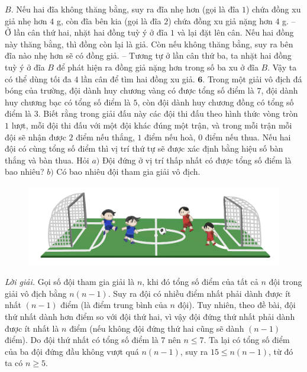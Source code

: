 \begin{multicols}{2}
	\vskip 0.1cm
	$B.$ Nếu hai đĩa không thăng bằng, suy ra  đĩa nhẹ  hơn  (gọi là đĩa $1$) chứa đồng xu giả nhẹ hơn $4$ g, còn đĩa bên kia (gọi là đĩa $2$) chứa đồng xu giả nặng hơn $4$ g.
	\vskip 0.1cm
	-- Ở lần cân thứ hai, nhặt hai đồng tuỳ ý ở đĩa $1$ và lại đặt lên cân. Nếu hai đồng này thăng bằng, thì đồng còn lại là giả. Còn nếu không thăng bằng, suy ra bên đĩa nào nhẹ hơn sẽ có đồng giả.
	\vskip 0.1cm
	-- Tương tự ở lần cân thứ ba, ta nhặt hai đồng tuỳ ý ở đĩa $B$ để phát hiện ra đồng giả nặng hơn trong số ba  xu ở đĩa $B$.
	\vskip 0.1cm
	Vậy ta có thể dùng tối đa $4$ lần cân để tìm hai đồng xu giả.
	\vskip 0.1cm
	$\pmb{6.}$ 	Trong một giải vô địch đá bóng của trường, đội dành huy chương vàng có được tổng số điểm là $7$, đội dành huy chương bạc có tổng số điểm là $5$, còn đội dành huy chương đồng có tổng số điểm là $3$. Biết rằng trong giải đấu này các đội thi đấu theo hình thức vòng tròn $1$ lượt, mỗi đội thi đấu với một đội khác đúng một trận, và trong mỗi trận mỗi đội sẽ nhận được $2$ điểm nếu thắng, $1$ điểm nếu hoà, $0$ điểm nếu thua. Nếu hai đội có cùng tổng số điểm thì vị trí thứ tự sẽ được xác định bằng hiệu số bàn thắng và bàn thua. Hỏi 
	\vskip 0.1cm
	$a)$ Đội đứng ở vị trí thấp nhất có được tổng số điểm là bao nhiêu?
	\vskip 0.1cm
	$b)$	Có bao nhiêu đội tham gia giải vô địch.
	\begin{figure}[H]
		\centering
		\vspace*{-10pt}
		\captionsetup{labelformat= empty, justification=centering}
		\includegraphics[width=1\linewidth]{Hinh6}
		\vspace*{-10pt}
	\end{figure}
	\textit{Lời giải.} Gọi số đội tham gia giải là $n$, khi đó tổng số điểm của tất cả $n$ đội trong giải vô địch bằng $n(n-1)$. Suy ra đội có nhiều điểm nhất phải dành được ít nhất $(n-1)$ điểm (là điểm trung bình của $n$ đội). 
	\vskip 0.1cm
	Tuy nhiên, theo đề bài, đội thứ nhất dành hơn điểm so với đội thứ hai, vì vậy đội đứng thứ nhất phải dành được ít nhất là $n$ điểm (nếu không đội đứng thứ hai cũng sẽ dành $(n-1)$ điểm).
	\vskip 0.1cm
	Do đội thứ nhất có tổng số điểm là $7$ nên $n\le7$. Ta lại có tổng số điểm của ba đội đứng đầu không vượt quá $n(n-1)$, suy ra $15\le n(n-1)$, từ đó ta có $n\ge5$.

\end{multicols}
